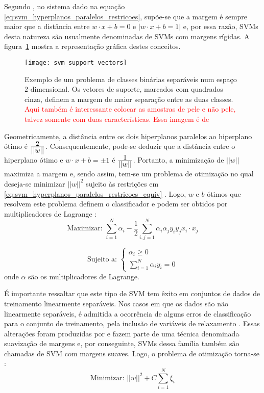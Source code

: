 Segundo \citet{campbell:00}, no sistema dado na equação \ref{eq:svm_hyperplanos_paralelos_restricoes}, supõe-se que a margem é sempre maior que a distância entre $w \cdot x + b = 0$ e $|w \cdot x + b = 1|$ e, por essa razão, SVMs desta natureza são usualmente denominadas de SVMs com margens rígidas. A figura~\ref{fig:svm_support_vectors} mostra a representação gráfica destes conceitos.

\begin{figure}[!h]
  \centering
  \texttt{[image: svm\_support\_vectors]}
  \caption[Exemplo de um problema de classes binárias separáveis num espaço $2$-dimensional]{Exemplo de um problema de classes binárias separáveis num espaço $2$-dimensional. Os vetores de suporte, marcados com quadrados cinza, definem a margem de maior separação entre as duas classes. \textcolor{red}{Aqui também é interessante colocar as amostras de pele e não pele, talvez somente com duas características. Essa imagem é de \citep{cortes:95}}}
  \label{fig:svm_support_vectors}
\end{figure}

Geometricamente, a distância entre os dois hiperplanos paralelos ao hiperplano ótimo é $\frac{\displaystyle 2}{\displaystyle ||w||}$. Consequentemente, pode-se deduzir que a distância entre o hiperplano ótimo e $w \cdot x + b = \pm 1$ é $\frac{\displaystyle 1}{\displaystyle ||w||}$. Portanto, a minimização de $||w||$ maximiza a margem e, sendo assim, tem-se um problema de otimização no qual deseja-se minimizar $||w||^2$ sujeito às restrições em \ref{eq:svm_hyperplanos_paralelos_restricoes_equiv} \citep{lorena:03}. Logo, $w$ e $b$ ótimos que resolvem este problema definem o classificador e podem ser obtidos por multiplicadores de Lagrange \citep{campbell:00}:
\begin{equation}
\label{eq:svm_margens_rigidas}
\text{Maximizar: } \sum_{i=1}^N \alpha_i - \frac{1}{2} \sum_{i, j=1}^N \alpha_i \alpha_j y_i y_j x_i\cdot x_j
\end{equation}

\begin{equation}
\label{eq:svm_margens_rigidas_restricoes}
\text{Sujeito a: }
\begin{cases}
    \alpha_i \geq 0\\[1em]
    \sum_{i=1}^N \alpha_i y_i = 0
\end{cases}
\end{equation}
\noindent onde $\alpha$ são os multiplicadores de Lagrange.

É importante ressaltar que este tipo de SVM tem êxito em conjuntos de dados de treinamento linearmente separáveis. Nos casos em que os dados são não linearmente separáveis, é admitida a ocorrência de alguns erros de classificação para o conjunto de treinamento, pela inclusão de variáveis de relaxamento \citep{lorena:03}. Essas alterações foram produzidas por \citet{cortes:95} e fazem parte de uma técnica denominada suavização de margens e, por conseguinte, SVMs dessa família também são chamadas de SVM com margens suaves. Logo, o problema de otimização torna-se \citep{lorena:03}:
\begin{equation}
\label{eq:svm_margens_suaves_def}
\text{Minimizar: } ||w||^2 + C\sum_{i=1}^N \xi_i
\end{equation}

